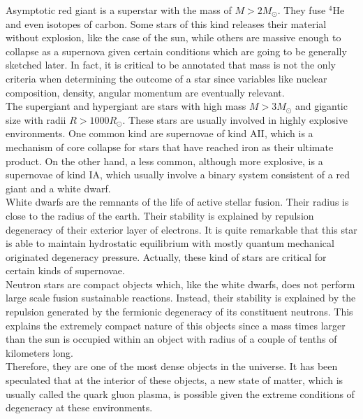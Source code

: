 \documentclass[openany]{book}
\begin{document}
Asymptotic red giant is a superstar with the mass of $M > 2M_{\odot}$. They fuse $\mathrm{{}^{4}He}$ and even isotopes of carbon. Some stars of this kind releases their material without explosion, like the case of the sun, while others are massive enough to collapse as a supernova given certain conditions which are going to be generally sketched later. In fact, it is critical to be annotated that mass is not the only criteria when determining the outcome of a star since variables like nuclear composition, density, angular momentum are eventually relevant.  \\

The supergiant and hypergiant are stars with high mass $M > 3M_{\odot}$ and gigantic size with radii $R > 1000R_{\odot}$. These stars are usually involved in highly explosive environments. One common kind are supernovae of kind AII, which is a mechanism of core collapse for stars that have reached iron as their ultimate product. On the other hand, a less common, although more explosive, is a supernovae of kind IA, which usually involve a binary system consistent of a red giant and a white dwarf. \\

White dwarfs are the remnants of the life of active stellar fusion. Their radius is close to the radius of the earth. Their stability is explained by repulsion degeneracy of their exterior layer of electrons. It is quite remarkable that this star is able to maintain hydrostatic equilibrium with mostly quantum mechanical originated degeneracy pressure.  Actually, these kind of stars are critical for certain kinds of supernovae. \\ 

Neutron stars are compact objects which, like the white dwarfs, does not perform large scale fusion sustainable reactions. Instead, their stability is explained by the repulsion generated by the fermionic degeneracy of its constituent neutrons. This explains the extremely compact nature of this objects since a mass times larger than the sun is occupied within an object with radius of a couple of tenths of kilometers long. \\ 

Therefore, they are one of the most dense objects in the universe.  It has been speculated that  at the interior of these objects, a new state of matter, which is usually called the quark gluon plasma, is possible given the extreme conditions of degeneracy at these environments.\\ 
\end{document}
